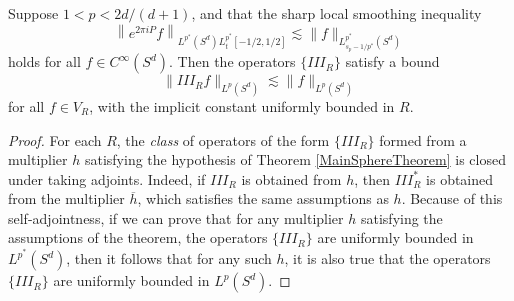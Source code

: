 \begin{theorem}
    Suppose $1 < p < 2d/(d+1)$, and that the sharp local smoothing inequality
    \[ \left\| e^{2 \pi i P} f \right\|_{L^{p^*}(S^d) L^{p^*}_t[-1/2, 1/2]} \lesssim \| f \|_{L^{p^*}_{s_p - 1/p^*}(S^d)} \]
    holds for all $f \in C^\infty(S^d)$. Then the operators $\{ III_R \}$ satisfy a bound
    \[ \| III_R f \|_{L^p(S^d)} \lesssim \| f \|_{L^p(S^d)} \]
    for all $f \in V_R$, with the implicit constant uniformly bounded in $R$.
\end{theorem}
\begin{proof}
    For each $R$, the \emph{class} of operators of the form $\{ III_R \}$ formed from a multiplier $h$ satisfying the hypothesis of Theorem \ref{MainSphereTheorem} is closed under taking adjoints. Indeed, if $III_R$ is obtained from $h$, then $III_R^*$ is obtained from the multiplier $\overline{h}$, which satisfies the same assumptions as $h$. Because of this self-adjointness, if we can prove that for any multiplier $h$ satisfying the assumptions of the theorem, the operators $\{ III_R \}$ are uniformly bounded in $L^{p^*}(S^d)$, then it follows that for any such $h$, it is also true that the operators $\{ III_R \}$ are uniformly bounded in $L^p(S^d)$.


\end{proof}
